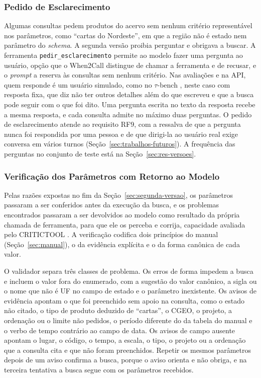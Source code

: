 \subsubsection{Pedido de Esclarecimento}
\label{sec:pedir-esclarecimento}

Algumas consultas pedem produtos do acervo sem nenhum critério representável nos parâmetros, como ``cartas do Nordeste'', em que a região não é estado nem parâmetro do \textit{schema}. A segunda versão proibia perguntar e obrigava a buscar. A ferramenta \texttt{pedir\_esclarecimento} permite ao modelo fazer uma pergunta ao usuário, opção que o When2Call \cite{ross2025when2call} distingue de chamar a ferramenta e de recusar, e o \textit{prompt} a reserva às consultas sem nenhum critério. Nas avaliações e na API, quem responde é um usuário simulado, como no $\tau$-bench \cite{yao2025taubench}, neste caso com resposta fixa, que diz não ter outros detalhes além do que escreveu e que a busca pode seguir com o que foi dito. Uma pergunta escrita no texto da resposta recebe a mesma resposta, e cada consulta admite no máximo duas perguntas. O pedido de esclarecimento atende ao requisito RF9, com a ressalva de que a pergunta nunca foi respondida por uma pessoa e de que dirigi-la ao usuário real exige conversa em vários turnos (Seção~\ref{sec:trabalhos-futuros}). A frequência das perguntas no conjunto de teste está na Seção~\ref{sec:res-versoes}.

\subsubsection{Verificação dos Parâmetros com Retorno ao Modelo}
\label{sec:validador}

Pelas razões expostas no fim da Seção~\ref{sec:segunda-versao}, os parâmetros passaram a ser conferidos antes da execução da busca, e os problemas encontrados passaram a ser devolvidos ao modelo como resultado da própria chamada de ferramenta, para que ele os perceba e corrija, capacidade avaliada pelo CRITICTOOL \cite{huang2025critictool}. A verificação codifica dois princípios do manual (Seção~\ref{sec:manual}), o da evidência explícita e o da forma canônica de cada valor.

O validador separa três classes de problema. Os erros de forma impedem a busca e incluem o valor fora do enumerado, com a sugestão do valor canônico, a sigla ou o nome que não é UF no campo de estado e o parâmetro inexistente. Os avisos de evidência apontam o que foi preenchido sem apoio na consulta, como o estado não citado, o tipo de produto deduzido de ``cartas'', o CGEO, o projeto, a ordenação ou o limite não pedidos, o período diferente do da tabela do manual e o verbo de tempo contrário ao campo de data. Os avisos de campo ausente apontam o lugar, o código, o tempo, a escala, o tipo, o projeto ou a ordenação que a consulta cita e que não foram preenchidos. Repetir os mesmos parâmetros depois de um aviso confirma a busca, porque o aviso orienta e não obriga, e na terceira tentativa a busca segue com os parâmetros recebidos.


